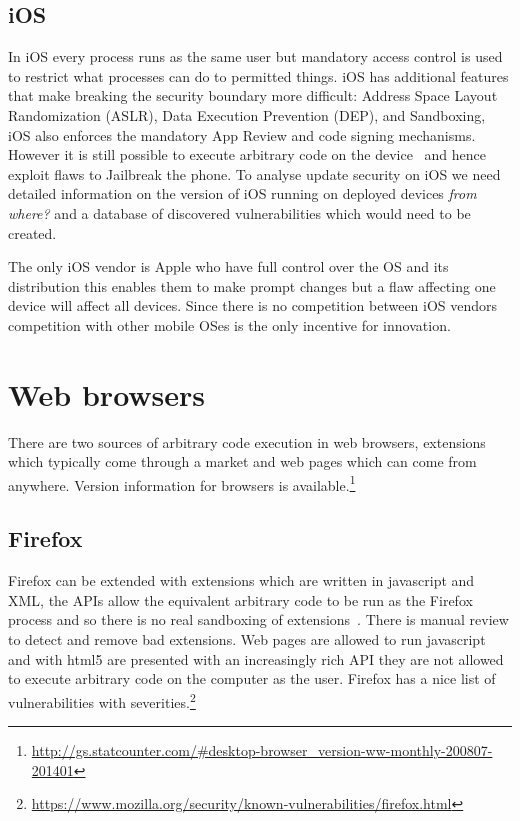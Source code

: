 \documentclass[12pt,a4paper]{article}
\begin{document}
\subsection{iOS}
In iOS every process runs as the same user but mandatory access control is used to restrict what processes can do to permitted things.
iOS has additional features that make breaking the security boundary more difficult: Address Space Layout Randomization (ASLR), Data Execution Prevention (DEP), and Sandboxing, iOS also enforces the mandatory App Review and code signing mechanisms.
However it is still possible to execute arbitrary code on the device~\cite{Wang2013a} and hence exploit flaws to Jailbreak the phone.
To analyse update security on iOS we need detailed information on the version of iOS running on deployed devices \emph{from where?} and a database of discovered vulnerabilities which would need to be created.

The only iOS vendor is Apple who have full control over the OS and its distribution this enables them to make prompt changes but a flaw affecting one device will affect all devices.
Since there is no competition between iOS vendors competition with other mobile OSes is the only incentive for innovation.

\section{Web browsers}
There are two sources of arbitrary code execution in web browsers, extensions which typically come through a market and web pages which can come from anywhere.
Version information for browsers is available.\footnote{\url{http://gs.statcounter.com/#desktop-browser_version-ww-monthly-200807-201401}}

\subsection{Firefox}
Firefox can be extended with extensions which are written in javascript and XML, the APIs allow the equivalent arbitrary code to be run as the Firefox process and so there is no real sandboxing of extensions~\cite{Lerner2013}.
There is manual review to detect and remove bad extensions.
Web pages are allowed to run javascript and with html5 are presented with an increasingly rich API they are not allowed to execute arbitrary code on the computer as the user.
Firefox has a nice list of vulnerabilities with severities.\footnote{\url{https://www.mozilla.org/security/known-vulnerabilities/firefox.html}}
\end{document}
